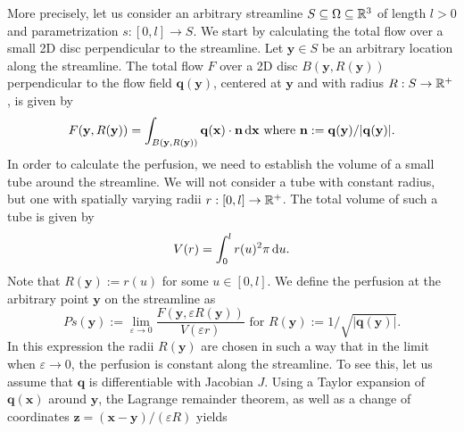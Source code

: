 \documentclass[final,5p,times,twocolumn]{elsarticle}
\begin{document}
	More precisely, let us consider an arbitrary streamline $S \subseteq \Omega \subseteq \mathbb{R}^3$ of length $l>0$ and parametrization $s:[0,l] \to S$.
	We start by calculating the total flow over a small 2D disc perpendicular to the streamline.
	Let $\mathbf{y} \in S$ be an arbitrary location along the streamline. 
	The total flow $F$ over a 2D disc $B(\mathbf{y},R(\mathbf{y}))$ perpendicular to the flow field $\mathbf{q}(\mathbf{y})$, centered at $\mathbf{y}$ and with radius $R:S\to\mathbb{R}^+$, is given by
	\begin{equation}
		F(\mathbf{y},R(\mathbf{y})) = \int_{B(\mathbf{y},R(\mathbf{y}))} \mathbf{q}(\mathbf{x}) \cdot \mathbf{n} \,\mathrm{d} \mathbf{x} \text{ where }\mathbf{n} := \mathbf{q}(\mathbf{y})/\vert \mathbf{q}(\mathbf{y}) \vert.
		\label{eq:Fdisc}
	\end{equation}
	In order to calculate the perfusion, we need to establish the volume of a small tube around the streamline.
	We will not consider a tube with constant radius, but one with spatially varying radii $r:[0,l] \to \mathbb{R}^+$.
	The total volume of such a tube is given by
	\begin{equation}
		V(r) = \int_0^l r(u)^2 \pi \,\mathrm{d} u.
	\end{equation}
        Note that $R(\mathbf{y}):=r(u)$ for some $u \in [0,l]$.
        We define the perfusion at the arbitrary point $\mathbf{y}$ on the streamline as
	\begin{equation}
		Ps(\mathbf{y}):=  \lim_{\varepsilon \to 0} \frac{F(\mathbf{y},\varepsilon R(\mathbf{y}))}{V(\varepsilon r)} \text{ for } R(\mathbf{y}):=1/\sqrt{\vert \mathbf{q}(\mathbf{y}) \vert}.
		\label{eq:perfusiondef}
	\end{equation}
	In this expression the radii $R(\mathbf{y})$ are chosen in such a way that in the limit when $\varepsilon \to 0$, the perfusion is constant along the streamline. 
	To see this, let us assume that $\mathbf{q}$ is differentiable with Jacobian $J$.
	Using a Taylor expansion of $\mathbf{q}(\mathbf{x})$ around $\mathbf{y}$, the Lagrange remainder theorem, as well as a change of coordinates $\mathbf{z} = (\mathbf{x}-\mathbf{y})/(\varepsilon R)$ yields 
\end{document}
